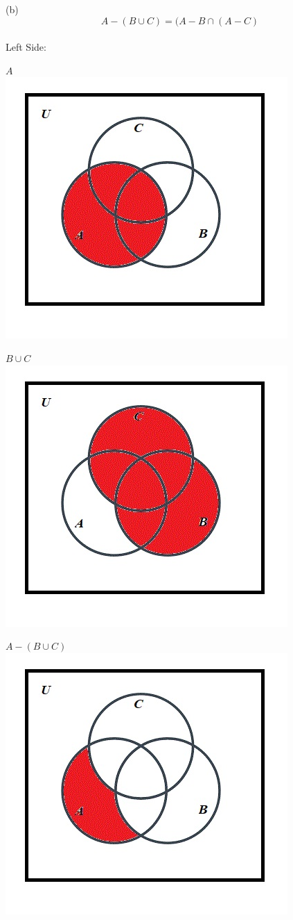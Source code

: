 \documentclass[10pt]{article}
\begin{document}
(b)
$$A - (B \cup C) = (A - B \cap (A - C)$$\\

Left Side:

$A$\\
\includegraphics[scale=0.55]{12}

$B \cup C$\\
\includegraphics[scale=0.55]{24}

$A - (B \cup C)$\\
\includegraphics[scale=0.55]{25}
\end{document}
